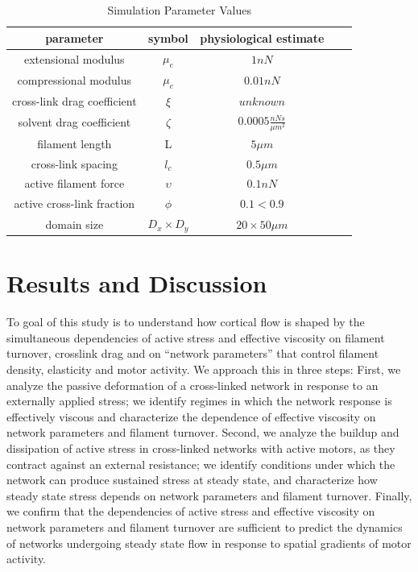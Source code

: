 \documentclass[10pt,letterpaper]{article}
\begin{document}
\begin{table}[h]
\centering
\caption{Simulation Parameter Values}
\label{table:para}
\begin{tabular}{|c|c|c|c|c|}
\hline
{\bf parameter}             & {\bf symbol} & {\bf physiological estimate}          \\ \hline
extensional modulus         & $\mu_e$        & $1 nN $                                               \\
compressional modulus             & $\mu_c$     & $ 0.01 nN $                           \\
cross-link drag coefficient & $\xi$      & $unknown $              \\
solvent drag coefficient     & $\zeta$        & $0.0005 \frac{nN s}{\mu m^2} $      \\
filament length             & L            & $5 \mu m$                                          \\
cross-link spacing          & $l_c$        & $0.5 \mu m$                                         \\
active filament force          & $\upsilon$        & $0.1 nN$                                         \\
active cross-link fraction          & $\phi$        & $0.1<0.9$                                         \\
domain size                 & $D_x\times D_y$            & $20\times 50 \mu m$                                 \\ \hline
\end{tabular}
\end{table}



\section*{Results and Discussion}
To goal of this study is to understand how cortical flow is shaped by the simultaneous dependencies of active stress and effective viscosity on filament turnover, crosslink drag and on ``network parameters'' that control  filament density, elasticity and motor activity.   We approach this in three steps: First, we analyze the passive deformation of a cross-linked network in response to an externally applied stress; we identify regimes in which the network response is effectively viscous and characterize the dependence of effective viscosity on network parameters and filament turnover.  Second, we analyze the buildup and dissipation of active stress in cross-linked networks with active motors, as they contract against an external resistance; we identify conditions under which the network can produce sustained stress at steady state, and characterize how steady state stress depends on network parameters and filament turnover. Finally, we confirm that the dependencies of active stress and effective viscosity on network parameters and filament turnover are sufficient to predict the dynamics of networks undergoing steady state flow in response to spatial gradients of motor activity.
\end{document}
